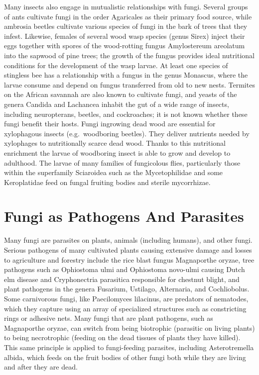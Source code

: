 Many insects also engage in mutualistic relationships with fungi. Several groups of ants cultivate fungi in the order Agaricales as their primary food source, while ambrosia beetles cultivate various species of fungi in the bark of trees that they infest. Likewise, females of several wood wasp species (genus Sirex) inject their eggs together with spores of the wood-rotting fungus Amylostereum areolatum into the sapwood of pine trees; the growth of the fungus provides ideal nutritional conditions for the development of the wasp larvae. At least one species of stingless bee has a relationship with a fungus in the genus Monascus, where the larvae consume and depend on fungus transferred from old to new nests. Termites on the African savannah are also known to cultivate fungi, and yeasts of the genera Candida and Lachancea inhabit the gut of a wide range of insects, including neuropterans, beetles, and cockroaches; it is not known whether these fungi benefit their hosts. Fungi ingrowing dead wood are essential for xylophagous insects (e.g.~woodboring beetles). They deliver nutrients needed by xylophages to nutritionally scarce dead wood. Thanks to this nutritional enrichment the larvae of woodboring insect is able to grow and develop to adulthood. The larvae of many families of fungicolous flies, particularly those within the superfamily Sciaroidea such as the Mycetophilidae and some Keroplatidae feed on fungal fruiting bodies and sterile mycorrhizae.

\hypertarget{fungi-as-pathogens-and-parasites}{%
\section{Fungi as Pathogens And Parasites}\label{fungi-as-pathogens-and-parasites}}

Many fungi are parasites on plants, animals (including humans), and other fungi. Serious pathogens of many cultivated plants causing extensive damage and losses to agriculture and forestry include the rice blast fungus Magnaporthe oryzae, tree pathogens such as Ophiostoma ulmi and Ophiostoma novo-ulmi causing Dutch elm disease and Cryphonectria parasitica responsible for chestnut blight, and plant pathogens in the genera Fusarium, Ustilago, Alternaria, and Cochliobolus. Some carnivorous fungi, like Paecilomyces lilacinus, are predators of nematodes, which they capture using an array of specialized structures such as constricting rings or adhesive nets. Many fungi that are plant pathogens, such as Magnaporthe oryzae, can switch from being biotrophic (parasitic on living plants) to being necrotrophic (feeding on the dead tissues of plants they have killed). This same principle is applied to fungi-feeding parasites, including Asterotremella albida, which feeds on the fruit bodies of other fungi both while they are living and after they are dead.

